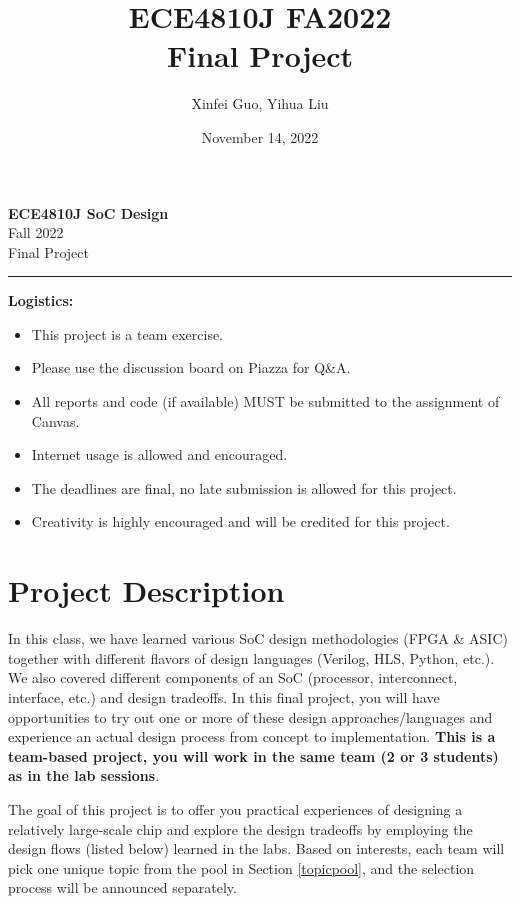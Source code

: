 \documentclass[a4paper,12pt,twoside]{article}
\author{Xinfei Guo, Yihua Liu}
\title{ECE4810J FA2022\\ \small Final Project}
\date{November 14, 2022}
\begin{document}
\thispagestyle{fancy}

\begin{center}
    \vspace*{0pt}
    \Large{\textbf{ECE4810J SoC Design}}\\
    \vspace*{2pt}
    \large{Fall 2022}\\
    \vspace*{10pt}
    \Large{\textcolor{caption2color}{Final Project}}\\
    \rule[-5pt]{.97\linewidth}{0.05em}
\end{center}

\textbf{Logistics:}
\begin{itemize}
    \item This project is a team exercise.
    \item Please use the discussion board on Piazza for Q\&A.
    \item All reports and code (if available) MUST be submitted to the assignment of Canvas.
    \item Internet usage is allowed and encouraged.
    \item The deadlines are final, no late submission is allowed for this project.
    \item Creativity is highly encouraged and will be credited for this project.
\end{itemize}
\newpage
\tableofcontents
\newpage
\section{Project Description}
In this class, we have learned various SoC design methodologies (FPGA \& ASIC) together with different flavors of design languages (Verilog, HLS, Python, etc.). We also covered different components of an SoC (processor, interconnect, interface, etc.) and design tradeoffs. In this final project, you will have opportunities to try out one or more of these design approaches/languages and experience an actual design process from concept to implementation. \textbf{This is a team-based project, you will work in the same team (2 or 3 students) as in the lab sessions}. 

The goal of this project is to offer you practical experiences of designing a relatively large-scale chip and explore the design tradeoffs by employing the design flows (listed below) learned in the labs. Based on interests, each team will pick one unique topic from the pool in Section \ref{topicpool}, and the selection process will be announced separately.
\end{document}
